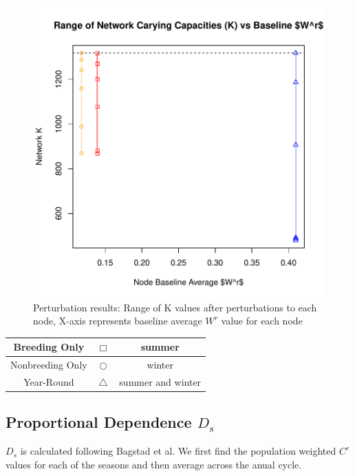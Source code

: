 \documentclass[10pt]{article}
\begin{document}
\vspace{-.5cm}
\begin{figure}[H]
\begin{center}
\includegraphics[width=.8\textwidth, height=.8\textwidth]{RGraphics-elk_barcr_WR}
\caption{Perturbation results: Range of K values after perturbations to each node, X-axis represents baseline average $W^r$ value for each node}\label{fig:elk_barcr_WR}
\end{center}
\end{figure}

\vspace{-.5cm}
\begin{tabular}{|c|c|c|}
\hline
{\color{red} Breeding Only} & $\Box$ & summer \\
\hline
{\color{orange} Nonbreeding Only} & $\bigcirc$ & winter \\
\hline
{\color{blue} Year-Round} & $\triangle$ &  summer and winter \\
\hline
\end{tabular}




\newpage
\subsection{Proportional Dependence \texorpdfstring{$D_s$}{DS}}

$D_s$ is calculated following Bagstad et al. We first find the population weighted $C^r$ values for each of the seasons and then average across the anual cycle.
\end{document}
